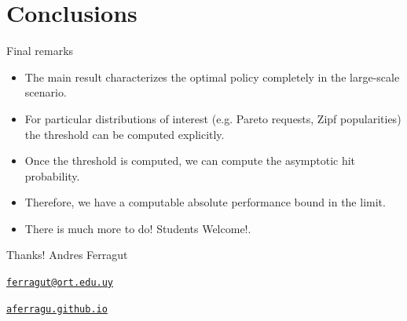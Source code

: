 \documentclass[aspectratio=169]{beamer}
\newenvironment*{myitem}[1][1.5em]{\begin{itemize}\setlength{\itemsep}{#1}}{\end{itemize}}
\begin{document}
\section{Conclusions}

\begin{frame}{Final remarks}
	
	\begin{myitem}[2em]
		\item The main result characterizes the optimal policy completely in the large-scale scenario.
		
		\item For particular distributions of interest (e.g. Pareto requests, Zipf popularities) the threshold can be computed explicitly.
		
		\item Once the threshold is computed, we can compute the asymptotic hit probability.
		
		\item Therefore, we have a computable absolute performance bound in the limit.
		\pause
		\item There is much more to do! \alert{Students Welcome!}.
		
	\end{myitem}
\end{frame}


\begin{frame}[plain]
	\vfill
	{\Huge \alert{Thanks!}}
	\vfill
	Andres Ferragut

	\href{mailto://ferragut@ort.edu.uy}{\alert{\texttt{ferragut@ort.edu.uy}}}
	
	\href{http://aferragu.github.io}{\alert{\texttt{aferragu.github.io}}}
\end{frame}
\end{document}
